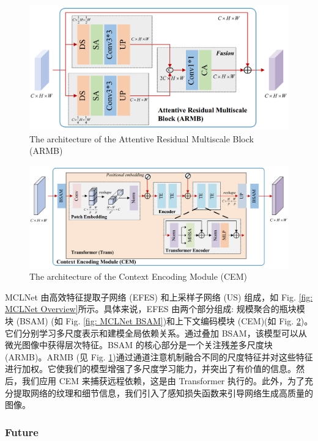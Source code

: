 \documentclass[a4paper]{ctexart}
\begin{document}
	\begin{figure}[htbp]
		\centering 
		\includegraphics[width=0.7\columnwidth]{picture/LLIE/MCLNet/ARMB}
		\caption{
			\label{fig: MCLNet ARMB} 
			The architecture of the Attentive Residual Multiscale Block (ARMB)
		}
	\end{figure}
	
	\begin{figure}[htbp]
		\centering 
		\includegraphics[width=0.7\columnwidth]{picture/LLIE/MCLNet/CEM}
		\caption{
			\label{fig: MCLNet CEM} 
			The architecture of the Context Encoding Module (CEM)
		}
	\end{figure}
	
	MCLNet 由高效特征提取子网络 (EFES) 和上采样子网络 (US) 组成，如 Fig. \ref{fig: MCLNet Overview}所示。具体来说，EFES 由两个部分组成: 规模聚合的瓶块模块 (BSAM) (如 Fig. \ref{fig: MCLNet BSAM})和上下文编码模块 (CEM)(如 Fig. \ref{fig: MCLNet CEM})。它们分别学习多尺度表示和建模全局依赖关系。通过叠加 BSAM，该模型可以从微光图像中获得层次特征。BSAM 的核心部分是一个关注残差多尺度块 (ARMB)。ARMB (见 Fig. \ref{fig: MCLNet ARMB})通过通道注意机制融合不同的尺度特征并对这些特征进行加权。它使我们的模型增强了多尺度学习能力，并突出了有价值的信息。然后，我们应用 CEM 来捕获远程依赖，这是由 Transformer 执行的。此外，为了充分提取网络的纹理和细节信息，我们引入了感知损失函数来引导网络生成高质量的图像。
	
	\subsubsection{Future}
	
\end{document}
